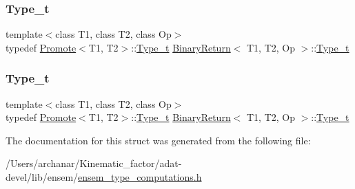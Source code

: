 \mbox{\label{structBinaryReturn_a77ba8984fbe3ead3c145da225432d208}} 
\subsubsection{\texorpdfstring{Type\_t}{Type\_t}\hspace{0.1cm}{\footnotesize\ttfamily [2/3]}}
{\footnotesize\ttfamily template$<$class T1, class T2, class Op$>$ \\
typedef \mbox{\hyperlink{structPromote}{Promote}}$<$T1, T2$>$\+::\mbox{\hyperlink{structBinaryReturn_a77ba8984fbe3ead3c145da225432d208}{Type\+\_\+t}} \mbox{\hyperlink{structBinaryReturn}{Binary\+Return}}$<$ T1, T2, Op $>$\+::\mbox{\hyperlink{structBinaryReturn_a77ba8984fbe3ead3c145da225432d208}{Type\+\_\+t}}}

\mbox{\label{structBinaryReturn_a77ba8984fbe3ead3c145da225432d208}} 
\subsubsection{\texorpdfstring{Type\_t}{Type\_t}\hspace{0.1cm}{\footnotesize\ttfamily [3/3]}}
{\footnotesize\ttfamily template$<$class T1, class T2, class Op$>$ \\
typedef \mbox{\hyperlink{structPromote}{Promote}}$<$T1, T2$>$\+::\mbox{\hyperlink{structBinaryReturn_a77ba8984fbe3ead3c145da225432d208}{Type\+\_\+t}} \mbox{\hyperlink{structBinaryReturn}{Binary\+Return}}$<$ T1, T2, Op $>$\+::\mbox{\hyperlink{structBinaryReturn_a77ba8984fbe3ead3c145da225432d208}{Type\+\_\+t}}}



The documentation for this struct was generated from the following file\+:\begin{DoxyCompactItemize}
\item 
/\+Users/archanar/\+Kinematic\+\_\+factor/adat-\/devel/lib/ensem/\mbox{\hyperlink{adat-devel_2lib_2ensem_2ensem__type__computations_8h}{ensem\+\_\+type\+\_\+computations.\+h}}\end{DoxyCompactItemize}
